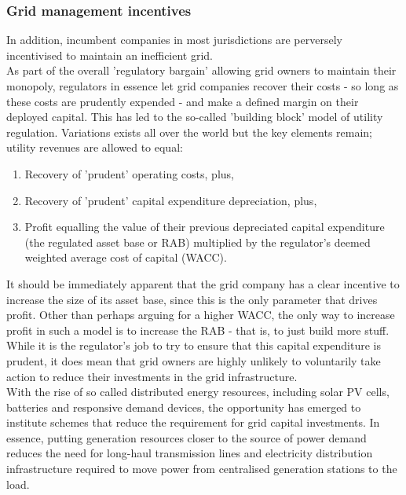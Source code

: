 \documentclass{article}
\theoremstyle{definition}
\theoremstyle{plain} %
\begin{document}
\subsubsection{Grid management incentives}

In addition, incumbent companies in most jurisdictions are perversely incentivised to maintain an inefficient grid.\\

\noindent As part of the overall 'regulatory bargain' allowing grid owners to maintain their monopoly, regulators in essence let grid companies recover their costs -  so long as these costs are prudently expended - and make a defined margin on their deployed capital. This has led to the so-called 'building block' model of utility regulation. Variations exists all over the world but the key elements remain; utility revenues are allowed to equal:

\begin{enumerate}
\item{Recovery of 'prudent' operating costs,  plus,}
\item{Recovery of 'prudent' capital expenditure depreciation, plus,}
\item{Profit equalling the value of their previous depreciated capital expenditure (the regulated asset base or RAB) multiplied by the regulator's deemed weighted average cost of capital (WACC).}
\end{enumerate}

\noindent It should be immediately apparent that the grid company has a clear incentive to increase the size of its asset base, since this is the only parameter that drives profit. Other than perhaps arguing for a higher WACC, the only way to increase profit in such a model is to increase the RAB - that is, to just build more stuff.\\

\noindent While it is the regulator's job to try to ensure that this capital expenditure is prudent, it does mean that grid owners are highly unlikely to voluntarily take action to reduce their investments in the grid infrastructure. \\

\noindent With the rise of so called distributed energy resources, including solar PV cells, batteries and responsive demand devices, the opportunity has emerged to institute schemes that reduce the requirement for grid capital investments.  In essence, putting generation resources closer to the source of power demand reduces the need for long-haul transmission lines and electricity distribution infrastructure required to move power from centralised generation stations to the load. \\
\end{document}
